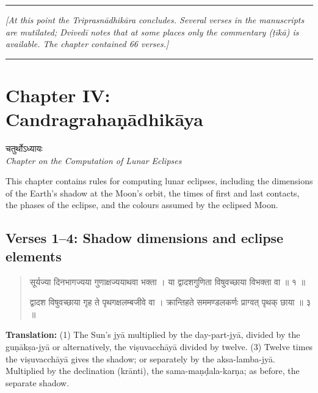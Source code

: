\documentclass[11pt,a4paper]{article}
\newcommand{\dev}[1]{{\devanagarifont #1}}
\newenvironment{sanskritverse}{%
  \begin{quote}%
  \devanagarifont%
  \setlength{\leftmargin}{2em}%
}{\end{quote}}
\begin{document}
\vspace{0.5cm}
\hrule
\vspace{0.3cm}
\textit{[At this point the Triprasnādhikāra concludes. Several verses in the manuscripts 
are mutilated; Dvivedī notes that at some places only the commentary (ṭīkā) is available. 
The chapter contained 66 verses.]}
\vspace{0.3cm}
\hrule
\vspace{0.5cm}

\newpage


\section*{Chapter IV: Candragrahaṇādhikāya}

\begin{center}
\dev{चतुर्थोऽध्यायः}\\[0.2cm]
\textit{Chapter on the Computation of Lunar Eclipses}
\end{center}

This chapter contains rules for computing lunar eclipses, including the dimensions 
of the Earth's shadow at the Moon's orbit, the times of first and last contacts, 
the phases of the eclipse, and the colours assumed by the eclipsed Moon.

\subsection*{Verses 1--4: Shadow dimensions and eclipse elements}

\begin{sanskritverse}
\dev{सूर्यज्या दिनभागज्यया गुणाक्षज्ययाथवा भक्ता} ।
\dev{या द्वादशगुणिता विषुवच्छाया विभक्ता वा ॥ १ ॥}

\dev{द्वादश विषुवच्छाया गृह ते पृथगक्षलम्बजीवे वा} ।
\dev{क्रान्तिहते सममण्डलकर्णः प्राग्वत् पृथक् छाया ॥ ३ ॥}
\end{sanskritverse}

\textbf{Translation:} (1) The Sun's jyā multiplied by the day-part-jyā, divided 
by the guṇākṣa-jyā or alternatively, the viṣuvacchāyā divided by twelve. (3) Twelve 
times the viṣuvacchāyā gives the shadow; or separately by the aksa-lamba-jyā. 
Multiplied by the declination (krānti), the sama-maṇḍala-karṇa; as before, the 
separate shadow.
\end{document}
